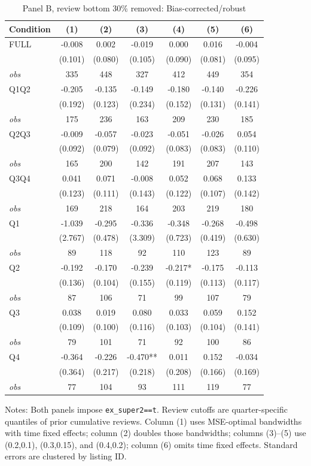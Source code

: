 \begin{table}[!htbp]
\centering
\caption{Panel B, review bottom 30\% removed: Bias-corrected/robust}
\begin{tabular}{lcccccc}
\toprule
Condition & (1) & (2) & (3) & (4) & (5) & (6) \\
\midrule
FULL & -0.008 & 0.002 & -0.019 & 0.000 & 0.016 & -0.004 \\
 & (0.101) & (0.080) & (0.105) & (0.090) & (0.081) & (0.095) \\
\textit{obs} & 335 & 448 & 327 & 412 & 449 & 354 \\
Q1Q2 & -0.205 & -0.135 & -0.149 & -0.180 & -0.140 & -0.226 \\
 & (0.192) & (0.123) & (0.234) & (0.152) & (0.131) & (0.141) \\
\textit{obs} & 175 & 236 & 163 & 209 & 230 & 185 \\
Q2Q3 & -0.009 & -0.057 & -0.023 & -0.051 & -0.026 & 0.054 \\
 & (0.092) & (0.079) & (0.092) & (0.083) & (0.083) & (0.110) \\
\textit{obs} & 165 & 200 & 142 & 191 & 207 & 143 \\
Q3Q4 & 0.041 & 0.071 & -0.008 & 0.052 & 0.068 & 0.133 \\
 & (0.123) & (0.111) & (0.143) & (0.122) & (0.107) & (0.142) \\
\textit{obs} & 169 & 218 & 164 & 203 & 219 & 180 \\
Q1 & -1.039 & -0.295 & -0.336 & -0.348 & -0.268 & -0.498 \\
 & (2.767) & (0.478) & (3.309) & (0.723) & (0.419) & (0.630) \\
\textit{obs} & 89 & 118 & 92 & 110 & 123 & 89 \\
Q2 & -0.192 & -0.170 & -0.239 & -0.217* & -0.175 & -0.113 \\
 & (0.136) & (0.104) & (0.155) & (0.119) & (0.113) & (0.117) \\
\textit{obs} & 87 & 106 & 71 & 99 & 107 & 79 \\
Q3 & 0.038 & 0.019 & 0.080 & 0.033 & 0.059 & 0.152 \\
 & (0.109) & (0.100) & (0.116) & (0.103) & (0.104) & (0.141) \\
\textit{obs} & 79 & 101 & 71 & 92 & 100 & 86 \\
Q4 & -0.364 & -0.226 & -0.470** & 0.011 & 0.152 & -0.034 \\
 & (0.364) & (0.217) & (0.218) & (0.208) & (0.166) & (0.169) \\
\textit{obs} & 77 & 104 & 93 & 111 & 119 & 77 \\
\bottomrule
\end{tabular}
\begin{minipage}{0.98\textwidth}\footnotesize
Notes: Both panels impose \texttt{ex\_super2==t}. Review cutoffs are quarter-specific quantiles of prior cumulative reviews. Column (1) uses MSE-optimal bandwidths with time fixed effects; column (2) doubles those bandwidths; columns (3)--(5) use (0.2,0.1), (0.3,0.15), and (0.4,0.2); column (6) omits time fixed effects. Standard errors are clustered by listing ID.
\end{minipage}
\end{table}


